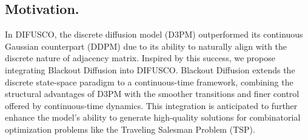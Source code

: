 \subsection{Motivation.}  
In DIFUSCO, the discrete diffusion model (D3PM) outperformed its continuous Gaussian counterpart (DDPM) due to its ability to naturally align with the discrete nature of adjacency matrix. Inspired by this success, we propose integrating Blackout Diffusion into DIFUSCO. Blackout Diffusion extends the discrete state-space paradigm to a continuous-time framework, combining the structural advantages of D3PM with the smoother transitions and finer control offered by continuous-time dynamics. This integration is anticipated to further enhance the model's ability to generate high-quality solutions for combinatorial optimization problems like the Traveling Salesman Problem (TSP).
